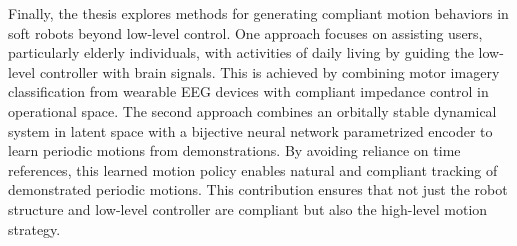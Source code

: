 Finally, the thesis explores methods for generating compliant motion behaviors in soft robots beyond low-level control. One approach focuses on assisting users, particularly elderly individuals, with activities of daily living by guiding the low-level controller with brain signals. This is achieved by combining motor imagery classification from wearable EEG devices with compliant impedance control in operational space. The second approach combines an orbitally stable dynamical system in latent space with a bijective neural network parametrized encoder to learn periodic motions from demonstrations. By avoiding reliance on time references, this learned motion policy enables natural and compliant tracking of demonstrated periodic motions. This contribution ensures that not just the robot structure and low-level controller are compliant but also the high-level motion strategy.




